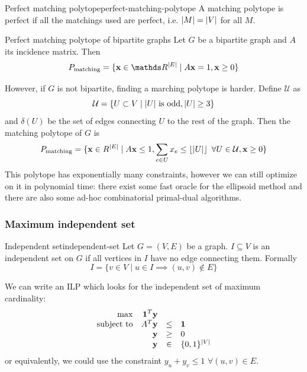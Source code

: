 \documentclass[12pt]{extarticle}
\renewcommand{\vec}[1]{\bvec{#1}}
\begin{document}
\begin{definition}{Perfect matching polytope}{perfect-matching-polytope}
	A matching polytope is perfect if all the matchings used are perfect, i.e. $\abs{M} = \abs{V}$ for
	all $M$.
\end{definition}

\begin{lemma}{Perfect matching polytope of bipartite graphs}{}
	Let $G$ be a bipartite graph and $A$ its incidence matrix. Then
	\begin{equation}
		P_\text{matching} = \{ \vec x \in \R^\abs{E} \mid A \vec x = 1, \vec x \geq 0\}
	\end{equation}
\end{lemma}

However, if $G$ is not bipartite, finding a marching polytope is harder.
Define $\mathcal U$ as
\begin{equation}
	\mathcal U = \{ U \subset V \mid \abs{U} \text{ is odd}, \abs{U} \geq 3 \}
\end{equation}
and $\delta(U)$ be the set of edges connecting $U$ to the rest of the graph.
Then the matching polytope of $G$ is
\begin{equation}
	P_\text{matching} = \{ \vec x \in R^\abs{E} \mid A \vec x \leq 1,
	\sum_{e \in U} x_e \leq \floor{\abs{U}} \enspace \forall U \in \mathcal U,
	\vec x \geq 0\}
\end{equation}
This polytope has exponentially many constraints, however we can still optimize on it in polynomial
time: there exist some fast oracle for the ellipsoid method and there are also some ad-hoc
combinatorial primal-dual algorithms.

\subsubsection{Maximum independent set}

\begin{definition}{Independent set}{independent-set}
	Let $G = (V, E)$ be a graph. $I \subseteq V$ is an independent set on $G$ if all vertices in $I$
	have no edge connecting them. Formally
	\begin{equation}
		I = \{ v \in V \mid u \in I \implies (u, v) \notin E \}
	\end{equation}
\end{definition}

We can write an ILP which looks for the independent set of maximum cardinality:
\begin{equation}
	\begin{array}{rrcl}
		\max              & \vec 1^T \vec y &      &                  \\
		\text{subject to} & A^T \vec y      & \leq & \vec 1           \\
		                  & \vec y          & \geq & 0                \\
		                  & \vec y          & \in  & \{0, 1\}^\abs{V}
	\end{array}
\end{equation}
or equivalently, we could use the constraint $y_u + y_v \leq 1$ $\forall (u, v) \in E$.
\end{document}

